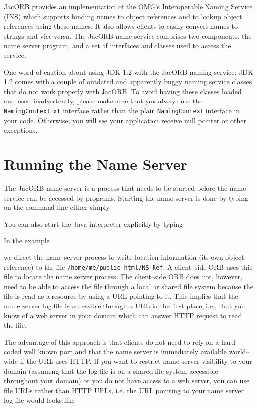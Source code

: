 \documentclass[12pt]{scrbook}
\begin{document}
JacORB provides an implementation of the OMG's Interoperable Naming
Service (INS) which supports binding names to object references and to
lookup object references using these names.  It also allows clients to
easily convert names to strings and vice versa.  The JacORB name
service comprises two components: the name server program, and a set
of interfaces and classes used to access the service.


One word of caution about using JDK 1.2 with the JacORB naming service: JDK
1.2 comes with a couple of outdated and apparently buggy naming service
classes that do not work properly with JacORB. To avoid having these classes
loaded and used inadvertently, please make sure that you always use the {\tt
  NamingContextExt} interface rather than the plain {\tt NamingContext}
interface in your code. Otherwise, you will see your application receive null
pointer or other exceptions.

\section{Running the Name Server}

The JacORB  name server is a  process that needs to  be started before
the name service can be accessed by programs. Starting the name server
is done by typing on the command line either simply


You can also start the Java interpreter explicitly by typing


In the example


we direct the name server process to write location information (its
own object reference) to the file {\tt /home/me/public\_html/NS\_Ref}.
A client--side ORB uses this file to locate the name server process.
The client--side ORB does not, however, need to be able to access the file through a
local or shared file system because  the file is read as a
 resource by using a URL pointing to it.  This implies that the
name server log file is accessible through a URL in the first place,
i.e., that you know of a web server in your domain which can answer
HTTP request to read the file. 

The advantage of this approach is  that clients do not need to rely on
a hard--coded well known port  and that the name server is immediately
available world--wide  if the URL uses  HTTP. If you  want to restrict
name server visibility  to your domain (assuming that  the log file is
on a shared  file system accessible throughout your  domain) or you do
not have  access to a  web server, you  can use file URLs  rather than
HTTP URLs,  i.e. the URL pointing  to your name server  log file would
looks like
\end{document}
